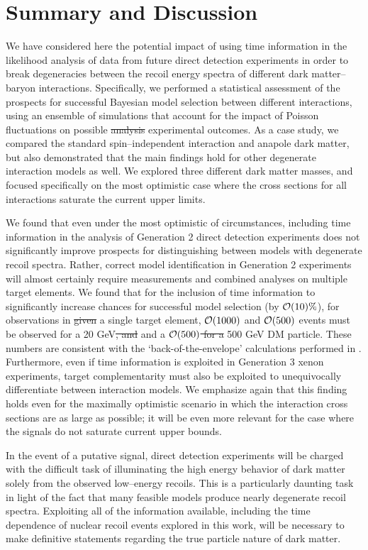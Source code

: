 \documentclass[11pt]{article}
\newcommand{\sjwColor}{red}
\newcommand{\sjw}[1]{{\color{\sjwColor} #1}}
\newcommand{\sjwrm}[1]{{\color{\sjwColor}\protect\sout{#1}}}
\begin{document}
\section{Summary and Discussion}\label{sec:conclusion}
We have considered here the potential impact of using time information in the likelihood analysis of data from future direct detection experiments in order to break degeneracies between the recoil energy spectra of different dark matter--baryon interactions. Specifically, we performed a statistical assessment of the prospects for successful Bayesian model selection between different interactions, using an ensemble of simulations that account for the impact of Poisson fluctuations on possible \sjwrm{analysis} \sjw{experimental} outcomes. As a case study, we compared the standard spin--independent interaction and anapole dark matter, but also demonstrated that the main findings hold for other degenerate interaction models as well. We explored three different dark matter masses, and focused specifically on the most optimistic case where the cross sections for all interactions saturate the current upper limits. 

We found that even under the most optimistic of circumstances, including time information in the analysis of Generation 2 direct detection experiments does not significantly improve prospects for distinguishing between models with degenerate recoil spectra. Rather, correct model identification in Generation 2 experiments will almost certainly require measurements and combined analyses on multiple target elements. We found that for the inclusion of time information to significantly increase chances for successful model selection (by ${\cal O}(10)\%$), \sjw{for observations in }\sjwrm{given} a single target element, ${\cal O}(1000)$ \sjw{and ${\cal O}(500)$} events must be observed for a 20 GeV\sjwrm{, and}\sjw{and a} \sjwrm{${\cal O}(500)$ for a} 500 GeV DM particle. These numbers are consistent with the `back-of-the-envelope' calculations performed in \cite{DelNobile:2015nua}. Furthermore, even if time information is exploited in Generation 3 xenon experiments, target complementarity must also be exploited to unequivocally differentiate between interaction models. We emphasize again that this finding holds even for the maximally optimistic scenario in which the interaction cross sections are as large as possible; it will be even more relevant for the case where the signals do not saturate current upper bounds.

In the event of a putative signal, direct detection experiments will be charged with the difficult task of illuminating the high energy behavior of dark matter solely from the observed low--energy recoils. This is a particularly daunting task in light of the fact that many feasible models produce nearly degenerate recoil spectra. Exploiting all of the information available, including the time dependence of nuclear recoil events explored in this work, will be necessary to make definitive statements regarding the true particle nature of dark matter. 
\bigskip
\end{document}
